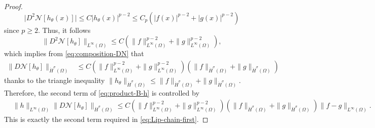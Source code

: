 \documentclass[a4paper,11pt]{article} %
\theoremstyle{remark}
\theoremstyle{definition}
\numberwithin{equation}{section}
\begin{document}
\begin{proof}
\[
\big|D^2\mathcal{N}[h_\theta(x)]\big|
\le
C|h_\theta(x)|^{p-2}
\le
C_p
\left(
|f(x)|^{p-2}+|g(x)|^{p-2}
\right)
\]
since \(p\ge2\). Thus, it follows
\begin{equation*}
\big\|D^2\mathcal N[h_\theta]\big\|_{L^\infty(\Omega)}
\le
C
\left(
\|f\|_{L^\infty(\Omega)}^{p-2}
+
\|g\|_{L^\infty(\Omega)}^{p-2}
\right),
\end{equation*}
which implies from \eqref{eq:composition-DN} that
\begin{align*}
\big\|D\mathcal{N}[h_\theta]\big\|_{\dot H^\sigma(\Omega)}
&\le
C
\left(
\|f\|_{L^\infty(\Omega)}^{p-2}
+
\|g\|_{L^\infty(\Omega)}^{p-2}
\right) \left(
\|f\|_{\dot H^\sigma(\Omega)}
+
\|g\|_{\dot H^\sigma(\Omega)}
\right)
\end{align*}
thanks to the triangle inequality $\|h_\theta\|_{\dot H^\sigma(\Omega)} \le
\|f\|_{\dot H^\sigma(\Omega)}
+
\|g\|_{\dot H^\sigma(\Omega)}$. Therefore, the second term of \eqref{eq:product-B-h} is controlled by
\begin{align}
&\|h\|_{L^\infty(\Omega)}
\big\|D\mathcal{N}[h_\theta]\big\|_{\dot H^\sigma(\Omega)}
\le
C
\left(
\|f\|_{L^\infty(\Omega)}^{p-2}
+
\|g\|_{L^\infty(\Omega)}^{p-2}
\right)
\left(
\|f\|_{\dot H^\sigma(\Omega)}
+
\|g\|_{\dot H^\sigma(\Omega)}
\right)
\|f-g\|_{L^\infty(\Omega)}.
\label{eq:second-product-term}
\end{align}
This is exactly the second term required in
\eqref{eq:Lip-chain-first}. \medskip


\end{proof}
\end{document}
